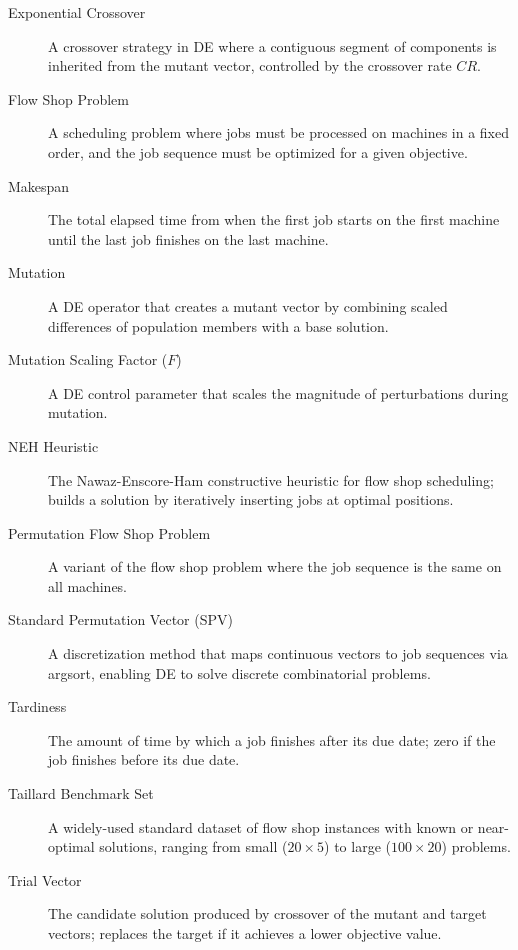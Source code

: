 \documentclass{article}
\begin{document}
\begin{description}
    \item[Exponential Crossover] A crossover strategy in DE where a contiguous segment of components is inherited from the mutant vector, controlled by the crossover rate $CR$.
    
    \item[Flow Shop Problem] A scheduling problem where jobs must be processed on machines in a fixed order, and the job sequence must be optimized for a given objective.
    
    \item[Makespan] The total elapsed time from when the first job starts on the first machine until the last job finishes on the last machine.
    
    \item[Mutation] A DE operator that creates a mutant vector by combining scaled differences of population members with a base solution.
    
    \item[Mutation Scaling Factor ($F$)] A DE control parameter that scales the magnitude of perturbations during mutation.
    
    \item[NEH Heuristic] The Nawaz-Enscore-Ham constructive heuristic for flow shop scheduling; builds a solution by iteratively inserting jobs at optimal positions.
    
    \item[Permutation Flow Shop Problem] A variant of the flow shop problem where the job sequence is the same on all machines.
    
    \item[Standard Permutation Vector (SPV)] A discretization method that maps continuous vectors to job sequences via argsort, enabling DE to solve discrete combinatorial problems.
    
    \item[Tardiness] The amount of time by which a job finishes after its due date; zero if the job finishes before its due date.
    
    \item[Taillard Benchmark Set] A widely-used standard dataset of flow shop instances with known or near-optimal solutions, ranging from small ($20 \times 5$) to large ($100 \times 20$) problems.
    
    \item[Trial Vector] The candidate solution produced by crossover of the mutant and target vectors; replaces the target if it achieves a lower objective value.
\end{description}
\end{document}
